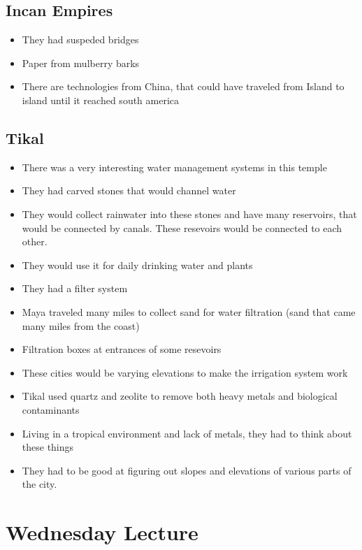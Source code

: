 \documentclass{article}
\begin{document}
\subsection{Incan Empires}
\begin{itemize}
  \item They had suspeded bridges
  \item Paper from mulberry barks
  \item There are technologies from China, that could have traveled from Island to island
    until it reached south america
\end{itemize}

\subsection{Tikal}
\begin{itemize}
  \item There was a very interesting water management systems in this temple
  \item They had carved stones that would channel water
  \item They would collect rainwater into these stones
    and have many reservoirs,
    that would be connected by canals.
    These resevoirs would be connected to each other.
  \item They would use it for daily drinking water and plants
  \item They had a filter system
  \item Maya traveled many miles to collect sand for water filtration
    (sand that came many miles from the coast)
  \item Filtration boxes at entrances of some resevoirs
  \item These cities would be varying elevations to make the irrigation system work
  \item Tikal used quartz and zeolite to remove both heavy metals and biological contaminants
  \item Living in a tropical environment and lack of metals, they had to think about
    these things
  \item They had to be good at figuring out slopes and elevations of various parts
    of the city.
\end{itemize}

\section*{Wednesday Lecture}
\end{document}
